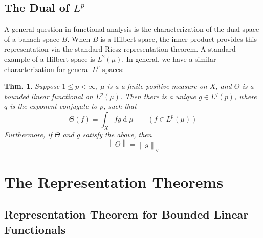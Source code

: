 \documentclass[12pt, a4paper]{book}
\renewcommand{\d}[1]{\ensuremath{\operatorname{d}\!{#1}}} %
\newcommand{\norm}[1]{\left\lVert#1\right\rVert} %
\newtheorem{theorem}{Thm.}[section]
\theoremstyle{nonumberplain}
\begin{document}
\section{The Dual of $L^p$}
A general question in functional analysis is the characterization of the dual space of a banach space $B$.
When $B$ is a Hilbert space, the inner product provides this representation via the standard Riesz representation theorem.
A standard example of a Hilbert space is $L^2(\mu)$.
In general, we have a similar characterization for general $L^p$ spaces:
\begin{theorem}
    Suppose $1\leq p < \infty$, $\mu$ is a a-finite positive measure on $X$, and $\Theta$ is a bounded linear functional on $L^p(\mu)$.
    Then there is a unique $g\in L^q(p)$, where $q$ is the exponent conjugate to $p$, such that
    \begin{equation*}
        \Theta(f)=\int_X fg\d{\mu}\qquad(f\in L^p(\mu))
    \end{equation*}
    Furthermore, if $\Theta$ and $g$ satisfy the above, then
    \begin{equation*}
        \norm{\Theta}=\norm{g}_q
    \end{equation*}
\end{theorem}
\chapter{The Representation Theorems}
\section{Representation Theorem for Bounded Linear Functionals}
\end{document}
